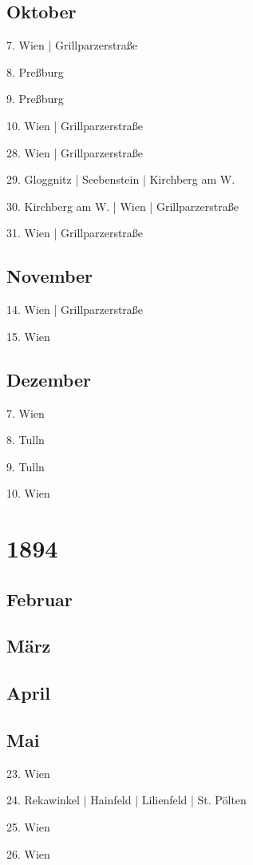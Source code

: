 \documentclass[twoside=false,titlepage=false,open=any, parskip=never, fontsize=10pt, headings=small, chapterprefix=false, appendixprefix=false, DIV=15]{scrbook}
\begin{document}
\begin{multicols}{3}
            \section*{Oktober}
            7. Wien | Grillparzerstraße\par
            8. Preßburg\par
            9. Preßburg\par
            10. Wien | Grillparzerstraße\par
            28. Wien | Grillparzerstraße\par
            29. Gloggnitz | Seebenstein | Kirchberg am W.\par
            30. Kirchberg am W. | Wien | Grillparzerstraße\par
            31. Wien | Grillparzerstraße\par
            \section*{November}
            14. Wien | Grillparzerstraße\par
            15. Wien\par
            \section*{Dezember}
            7. Wien\par
            8. Tulln\par
            9. Tulln\par
            10. Wien\par
            \chapter*{1894}
            \section*{Februar}
            \section*{März}
            \section*{April}
            \section*{Mai}
            23. Wien\par
            24. Rekawinkel | Hainfeld | Lilienfeld | St. Pölten\par
            25. Wien\par
            26. Wien\par

\end{multicols}
\end{document}
